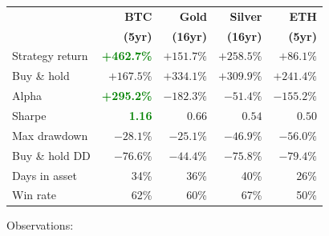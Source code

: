 \documentclass[11pt,a4paper]{article}
\begin{document}
\vspace{0.5em}
\begin{tabular}{@{}lrrrr@{}}
    \toprule
    & \textbf{BTC} & \textbf{Gold} & \textbf{Silver} & \textbf{ETH} \\
    & \textbf{(5yr)} & \textbf{(16yr)} & \textbf{(16yr)} & \textbf{(5yr)} \\
    \midrule
    Strategy return     & \textcolor{green}{\textbf{+462.7\%}} & $+151.7\%$ & $+258.5\%$ & $+86.1\%$  \\
    Buy \& hold         & $+167.5\%$ & $+334.1\%$ & $+309.9\%$ & $+241.4\%$ \\
    Alpha               & \textcolor{green}{\textbf{+295.2\%}} & $-182.3\%$ & $-51.4\%$  & $-155.2\%$ \\
    Sharpe              & \textcolor{green}{\textbf{1.16}} & $0.66$  & $0.54$  & $0.50$  \\
    Max drawdown        & $-28.1\%$  & $-25.1\%$  & $-46.9\%$  & $-56.0\%$  \\
    Buy \& hold DD      & $-76.6\%$  & $-44.4\%$  & $-75.8\%$  & $-79.4\%$  \\
    Days in asset       & 34\%       & 36\%       & 40\%       & 26\%       \\
    Win rate            & 62\%       & 60\%       & 67\%       & 50\%       \\
    \bottomrule
\end{tabular}

\vspace{0.5em}
Observations:
\end{document}
